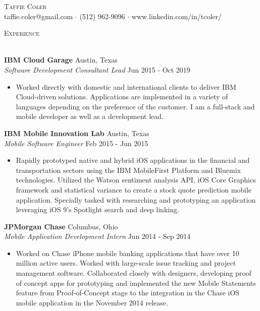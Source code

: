 \documentclass[a4paper]{article}
\newcommand{\lineunder} {
    \vspace*{-8pt} \\
    \hspace*{-18pt} \hrulefill \\
}
\newcommand{\header} [1] {
    {\hspace*{-18pt}\vspace*{6pt} \textsc{#1}}
    \vspace*{-6pt} \lineunder
}
\begin{document}
\vspace*{-40pt}

    

\vspace*{-10pt}
\begin{center}
	{\Huge \scshape {Taffie Coler}}\\
	taffie.coler@gmail.com $\cdot$ (512) 962-9096 $\cdot$ www.linkedin.com/in/tcoler/\\
\end{center}

\header{Experience}
\vspace{1mm}

\textbf{IBM Cloud Garage} \hfill Austin, Texas\\
\textit{Software Development Consultant Lead} \hfill Jun 2015 - Oct 2019\\
\vspace{-1mm}
\begin{itemize} \itemsep 1pt
	\item Worked directly with domestic and international clients to deliver IBM Cloud-driven solutions. Applications are implemented in a variety of languages depending on the preference of the customer. I am a full-stack and mobile developer as well as a development lead.
\end{itemize}
\textbf{IBM Mobile Innovation Lab} \hfill Austin, Texas\\
\textit{Mobile Software Engineer} \hfill Feb 2015 - Jun 2015\\
\vspace{-1mm}
\begin{itemize} \itemsep 1pt
	\item Rapidly prototyped native and hybrid iOS applications in the financial and transportation sectors using the IBM MobileFirst Platform and Bluemix technologies. Utilized the Watson sentiment analysis API, iOS Core Graphics framework and statistical variance to create a stock quote prediction mobile application. Specially tasked with researching and prototyping an application leveraging iOS 9’s Spotlight search and deep linking.
\end{itemize}
\textbf{JPMorgan Chase} \hfill Columbus, Ohio\\
\textit{Mobile Application Development Intern} \hfill Jun 2014 - Sep 2014\\
\vspace{-1mm}
\begin{itemize} \itemsep 1pt
	\item Worked on Chase iPhone mobile banking applications that have over 10 million active users. Worked with large-scale issue tracking and project management software. Collaborated closely with designers, developing proof of concept apps for prototyping and implemented the new Mobile Statements feature from Proof-of-Concept stage to the integration in the Chase iOS mobile application in the November 2014 release.
\end{itemize}
\end{document}
